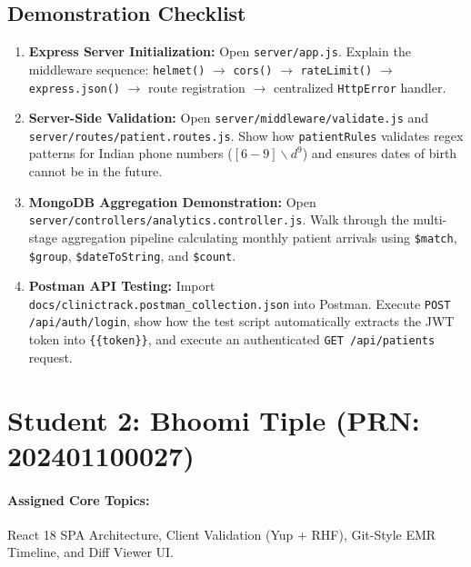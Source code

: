 \documentclass[12pt,a4paper,oneside]{report}
\begin{document}
\subsection{Demonstration Checklist}
\begin{enumerate}
    \item \textbf{Express Server Initialization:} Open \texttt{server/app.js}. Explain the middleware sequence: \texttt{helmet()} $\rightarrow$ \texttt{cors()} $\rightarrow$ \texttt{rateLimit()} $\rightarrow$ \texttt{express.json()} $\rightarrow$ route registration $\rightarrow$ centralized \texttt{HttpError} handler.
    \item \textbf{Server-Side Validation:} Open \texttt{server/middleware/validate.js} and \texttt{server/routes/patient.routes.js}. Show how \texttt{patientRules} validates regex patterns for Indian phone numbers ($[6-9]\backslash d^9$) and ensures dates of birth cannot be in the future.
    \item \textbf{MongoDB Aggregation Demonstration:} Open \texttt{server/controllers/analytics.controller.js}. Walk through the multi-stage aggregation pipeline calculating monthly patient arrivals using \texttt{\$match}, \texttt{\$group}, \texttt{\$dateToString}, and \texttt{\$count}.
    \item \textbf{Postman API Testing:} Import \texttt{docs/clinictrack.postman\_collection.json} into Postman. Execute \texttt{POST /api/auth/login}, show how the test script automatically extracts the JWT token into \texttt{\{\{token\}\}}, and execute an authenticated \texttt{GET /api/patients} request.
\end{enumerate}

\section{Student 2: Bhoomi Tiple (PRN: 202401100027)}
\paragraph{Assigned Core Topics:} React 18 SPA Architecture, Client Validation (Yup + RHF), Git-Style EMR Timeline, and Diff Viewer UI.
\end{document}
